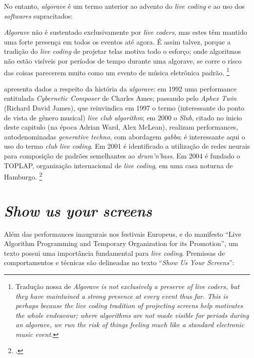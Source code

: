 No entanto, \emph{algorave} é um termo anterior ao advento do \emph{live coding} e ao uso dos \emph{softwares} supracitados:

\begin{citacao}
\emph{Algorave} não é sustentado exclusivamente por \emph{live coders}, mas estes têm mantido uma forte presença em todos os eventos até agora. É assim talvez, porque a tradição do \emph{live coding} de projetar telas motiva todo o esforço; onde algoritmos não estão visíveis por períodos de tempo durante uma algorave, se corre o risco das coisas parecerem muito como um evento de música eletrônica padrão. \cite[p.~356]{collins_algorave:_2014} \footnote{Tradução nossa de \emph{Algorave is not exclusively a preserve of live coders, but they have maintained a strong presence at every event thus far. This is perhaps because the live coding tradition of projecting screens help motivates the whole endeavour; where algorithms are not made visible for periods during an algorave, we run the risk of things feeling much like a standard electronic music event.}}
\end{citacao}


 apresenta dados a respeito da história da \emph{algorave}: em 1992 uma performance entitulada \emph{Cybernetic Composer} de Charles Ames; passando pelo \emph{Aphex Twin} (Richard David James), que  reinvindica em 1997 o termo (interessante do ponto de vista de gênero musical) \emph{live club algorithm}; em 2000 o \emph{Slub}, citado no inicio deste capitulo (na época Adrian Ward, Alex McLean), realizam performances, autodenominadas \emph{generative techno}, com abordagem \emph{gabba}; é interessante aqui o uso do termo \emph{club live coding}. Em 2001 é identificado a utilização de redes neurais para composição de padrões semelhantes ao \emph{drum'n'bass}. Em 2004 é fundado o TOPLAP, organização internacional  de \emph{live coding}, em uma casa noturna de Hamburgo. \footnote{.}

 

\section{\emph{Show us your screens}}\label{sec:showusyourscreens}

Além das performances inaugurais nos festivais Europeus, e do manifesto ``Live Algorithm Programming and Temporary Organization for its Promotion'', um texto possui uma importância fundamental para \emph{live coding}. Premissas de comportamentos e técnicas são delineadas no texto ``\emph{Show Us Your Screens}''\cite[p.~22; online]{griffiths_fluxus:_2008,mccallum_show_2011}:

